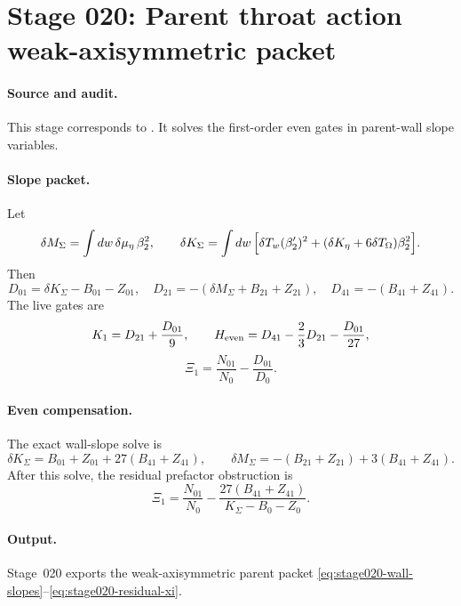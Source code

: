 \section[Stage 020]{Stage 020: Parent throat action weak-axisymmetric packet}
\label{stage:020}


\paragraph{Source and audit.}
This stage corresponds to
.
It solves the first-order even gates in parent-wall slope variables.

\paragraph{Slope packet.}
Let
\begin{equation}
\label{eq:stage020-wall-slopes}
\delta M_\Sigma=\int dw\,\delta\mu_\eta\,\beta_2^2,\qquad
\delta K_\Sigma=\int dw\,\Bigl[\delta T_w(\beta_2')^2+
(\delta K_\eta+6\delta T_\Omega)\beta_2^2\Bigr].
\end{equation}
Then
\begin{equation}
\label{eq:stage020-denominator-slopes}
D_{01}=\delta K_\Sigma-B_{01}-Z_{01},\quad
D_{21}=-(\delta M_\Sigma+B_{21}+Z_{21}),\quad
D_{41}=-(B_{41}+Z_{41}).
\end{equation}
The live gates are
\begin{equation}
\label{eq:stage020-gates}
K_1=D_{21}+\frac{D_{01}}9,\qquad
H_{\rm even}=D_{41}-\frac23D_{21}-\frac{D_{01}}{27},
\end{equation}
\begin{equation}
\label{eq:stage020-xi}
\Xi_1=\frac{N_{01}}{N_0}-\frac{D_{01}}{D_0}.
\end{equation}

\paragraph{Even compensation.}
The exact wall-slope solve is
\begin{equation}
\label{eq:stage020-wall-slope-solve}
\delta K_\Sigma=B_{01}+Z_{01}+27(B_{41}+Z_{41}),
\qquad
\delta M_\Sigma=-(B_{21}+Z_{21})+3(B_{41}+Z_{41}).
\end{equation}
After this solve, the residual prefactor obstruction is
\begin{equation}
\label{eq:stage020-residual-xi}
\Xi_1=\frac{N_{01}}{N_0}
-\frac{27(B_{41}+Z_{41})}{K_\Sigma-B_0-Z_0}.
\end{equation}

\paragraph{Output.}
Stage~020 exports the weak-axisymmetric parent packet
\eqref{eq:stage020-wall-slopes}--\eqref{eq:stage020-residual-xi}.
